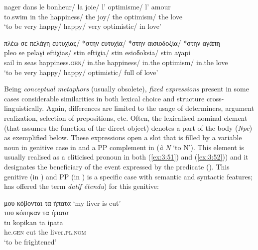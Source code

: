 \documentclass[output=paper]{langsci/langscibook}
\begin{document}
\begin{exe}
\ex \label{ex:3:49} 
\gll nager dans le bonheur/ la joie/ l’  optimisme/ l’ amour\\
 to.swim in the happiness/ the joy/ the optimism/ the love \\
\glt ‘to be very happy/ happy/  very optimistic/  in love’
\end{exe}

\begin{exe}
\ex \label{ex:3:50}
\glll πλέω σε πελάγη ευτυχίας/ *στην ευτυχία/ *στην αισιοδοξία/ *στην αγάπη \\
pleo   se pelaγi   eftiχias/ stin eftiχia/ stin esioδoksia/ stin aγapi\\
sail in seas happiness.\textsc{gen}/ in.the happiness/ in.the optimism/ in.the love\\
\glt %
‘to be very happy/ happy/ optimistic/ full of love’
\end{exe}


Being \textit{conceptual metaphors} (usually obsolete),
\textit{fixed expressions} present in \linebreak some cases
considerable similarities in both lexical choice and structure
cross-linguistically. Again, differences are limited to the usage of
determiners, argument realization, selection of prepositions, etc.
Often, the lexicalised nominal element (that assumes the function of
the direct object) denotes a part of the body (\textit{Npc}) as
exemplified below. These expressions open a slot that is filled by a
variable noun in genitive case in  and a PP complement in  (\textit{à N} ‘to N’). This element is usually realised as a cliticised
pronoun \textendash{} in both  (\ref{ex:3:51}) and   (\ref{ex:3:52})) \textendash{} and it designates the
beneficiary of the event expressed by the predicate (\citealt{leclere1976,fotop1993genitif}). This genitive (in ) and PP (in ) is a specific
case with semantic and syntactic features; \cite{leclere1976} has offered the term 
\textit{datif étendu}) for this genitive:

\begin{exe}
\ex \label{ex:3:51}
μου κόβονται τα ήπατα `my liver is cut'\\
\glll του κόπηκαν τα ήπατα \\
tu kopikan ta ipata\\
he.\textsc{gen} cut the liver.\textsc{pl.nom}\\
\glt %
`to be frightened’
\end{exe}
\end{document}
